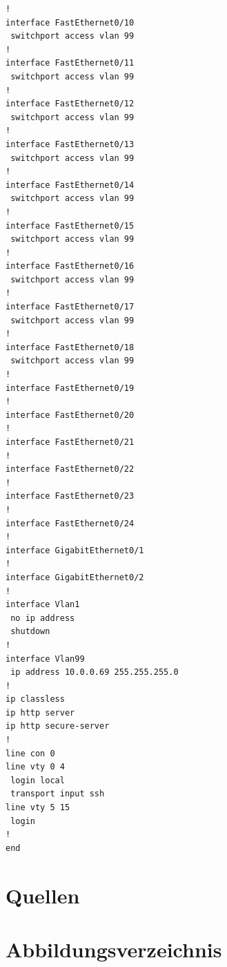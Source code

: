 \documentclass[a4paper]{article}
\begin{document}
\begin{lstlisting}
!
interface FastEthernet0/10
 switchport access vlan 99
!
interface FastEthernet0/11
 switchport access vlan 99
!
interface FastEthernet0/12
 switchport access vlan 99
!
interface FastEthernet0/13
 switchport access vlan 99
!
interface FastEthernet0/14
 switchport access vlan 99
!
interface FastEthernet0/15
 switchport access vlan 99
!
interface FastEthernet0/16
 switchport access vlan 99
!
interface FastEthernet0/17
 switchport access vlan 99
!
interface FastEthernet0/18
 switchport access vlan 99
!
interface FastEthernet0/19
!
interface FastEthernet0/20
!
interface FastEthernet0/21
!
interface FastEthernet0/22
!
interface FastEthernet0/23
!
interface FastEthernet0/24
!
interface GigabitEthernet0/1
!
interface GigabitEthernet0/2
!
interface Vlan1
 no ip address
 shutdown
!
interface Vlan99
 ip address 10.0.0.69 255.255.255.0
!
ip classless
ip http server
ip http secure-server
!
line con 0
line vty 0 4
 login local
 transport input ssh
line vty 5 15
 login
!
end
\end{lstlisting}
\newpage

\section{Quellen}

\newpage
\section{Abbildungsverzeichnis}

\listoffigures
\end{document}
